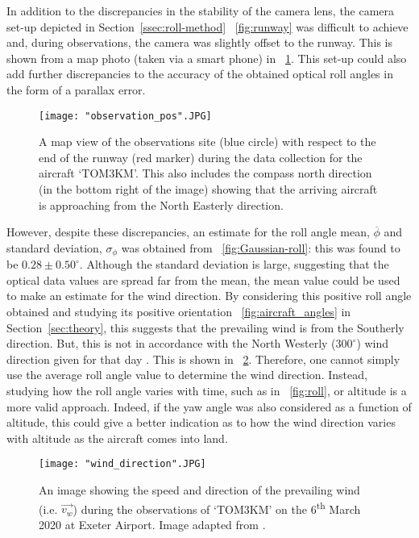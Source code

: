 \documentclass[11pt]{article}
\newcommand{\figref}[2][\figurename~]{#1\ref{#2}}
\newcommand{\secref}[2][Section~]{#1\ref{#2}}
\begin{document}
In addition to the discrepancies in the stability of the camera lens, the camera set-up depicted in \secref{ssec:roll-method} \figref{fig:runway} was difficult to achieve and, during observations, the camera was slightly offset to the runway. This is shown from a map photo (taken via a smart phone) in \figref{fig:map}. This set-up could also add further discrepancies to the accuracy of the obtained optical roll angles in the form of a parallax error.

\begin{figure}[h]
\centering
\texttt{[image: "observation\_pos".JPG]}
\caption{A map view of the observations site (blue circle) with respect to the end of the runway (red marker) during the data collection for the aircraft `TOM3KM'. This also includes the compass north direction (in the bottom right of the image) showing that the arriving aircraft is approaching from the North Easterly direction.}
\label{fig:map}
\end{figure}


However, despite these discrepancies, an estimate for the roll angle mean, $\overline{\phi}$ and standard deviation, $\sigma_{\phi}$ was obtained from \figref{fig:Gaussian-roll}: this was found to be $0.28 \pm 0.50^{\circ}$. Although the standard deviation is large, suggesting that the optical data values are spread far from the mean, the mean value could be used to make an estimate for the wind direction. By considering this positive roll angle obtained and studying its positive orientation \figref{fig:aircraft_angles} in \secref{sec:theory}, this suggests that the prevailing wind is from the Southerly direction. But, this is not in accordance with the North Westerly ($300^{\circ}$) wind direction given for that day \cite{Web07}. This is shown in \figref{fig:wind-direction}. Therefore, one cannot simply use the average roll angle value to determine the wind direction. Instead, studying how the roll angle varies with time, such as in \figref{fig:roll}, or altitude is a more valid approach. Indeed, if the yaw angle was also considered as a function of altitude, this could give a better indication as to how the wind direction varies with altitude as the aircraft comes into land.

\begin{figure}[h]
\centering
\texttt{[image: "wind\_direction".JPG]}
\caption{An image showing the speed and direction of the prevailing wind (i.e. $\Vec{v_w}$) during the observations of `TOM3KM' on the 6\textsuperscript{th} March 2020 at Exeter Airport. Image adapted from \cite{Web07}.}
\label{fig:wind-direction}
\end{figure}
\end{document}

